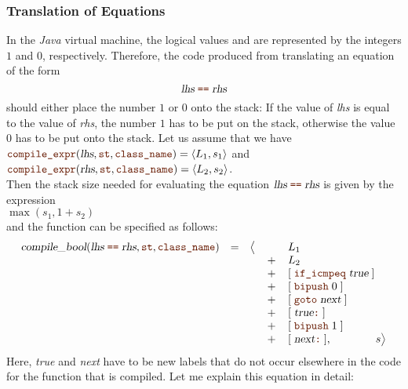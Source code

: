 \subsubsection{Translation of Equations}
In the \textsl{Java} virtual machine, the logical values  and  are represented by
the integers $1$ and $0$, respectively.  Therefore, the code produced from translating an equation of the form 
\[ \textsl{lhs}\; \mytt{==} \;\textsl{rhs} \]
should either place the number $1$ or $0$ onto the stack: If the value of \textsl{lhs} is equal to the value of
\textsl{rhs}, the number $1$ has to be put on the stack, otherwise the value $0$ has to be put onto the stack.
Let us assume that we have
\\[0.2cm]
\hspace*{1.3cm}
$\mytt{compile\_expr}(\textsl{lhs}, \mytt{st}, \mytt{class\_name}) = \pair(L_1, s_1)$ \quad and \quad
$\mytt{compile\_expr}(\textsl{rhs}, \mytt{st}, \mytt{class\_name}) = \pair(L_2, s_2)$.
\\[0.2cm]
Then the stack size needed for evaluating the equation $\textsl{lhs}\; \mytt{==} \;\textsl{rhs}$ is given by
the expression 
\\[0.2cm]
\hspace*{1.3cm}
$\max(s_1, 1 + s_2)$
\\[0.2cm]
and the function  can be specified as follows:
\[
   \begin{array}[t]{lcccl}
   \textsl{compile\_bool}(\textsl{lhs}\;\mytt{==}\;\textsl{rhs}, \mytt{st}, \mytt{class\_name}) & = & 
         \bigl\langle & \quad & L_1  \\
   &&& + & L_2 \\
   &&& + & [ \;\mytt{if\_icmpeq}\; \textsl{true} \; ]  \\
   &&& + & [ \;\mytt{bipush}\;0\; ]  \\
   &&& + & [ \;\mytt{goto}\;\textsl{next}\; ]  \\
   &&& + & [ \;\textsl{true}\mytt{:}\; ]  \\
   &&& + & [ \;\mytt{bipush}\;1\; ]  \\
   &&& + & [ \;\textsl{next}\mytt{:}\; ], \qquad\qquad s \bigr\rangle
   \end{array}
\]
Here, \textsl{true} and \textsl{next} have to be new labels that do not occur elsewhere in the code for the
function that is compiled.  Let me explain this equation in detail:
